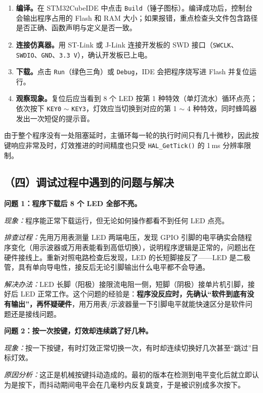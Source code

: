 \documentclass[UTF8,zihao=5,fontset=fandol]{ctexart}
\begin{document}
\begin{reportsection}{\ProcessTitle}{\ProcessHint}
  \begin{enumerate}[label=\arabic*)]
    \item \textbf{编译。}在 STM32CubeIDE 中点击 \texttt{Build}（锤子图标）。编译成功后，控制台会输出程序占用的 Flash 和 RAM 大小；如果报错，重点检查头文件包含路径是否正确、函数声明与定义是否一致。
    \item \textbf{连接仿真器。}用 ST-Link 或 J-Link 连接开发板的 SWD 接口（\texttt{SWCLK}、\texttt{SWDIO}、\texttt{GND}、\texttt{3.3\,V}），确认开发板已上电。
    \item \textbf{下载。}点击 \texttt{Run}（绿色三角）或 \texttt{Debug}，IDE 会把程序烧写进 Flash 并复位运行。
    \item \textbf{观察现象。}复位后应当看到 8 个 LED 按第 1 种特效（单灯流水）循环点亮；依次按下 \texttt{KEY0} $\sim$ \texttt{KEY3}，灯效应当切换到对应的第 1 $\sim$ 4 种特效，同时蜂鸣器发出一次短促的提示音。
  \end{enumerate}

  由于整个程序没有一处阻塞延时，主循环每一轮的执行时间只有几十微秒，因此按键响应非常及时，灯效推进的时间精度也只受 \texttt{HAL\_GetTick()} 的 1\,ms 分辨率限制。

  \subsection*{（四）调试过程中遇到的问题与解决}

  \textbf{问题 1：程序下载后 8 个 LED 全部不亮。}

  \emph{现象：}程序能正常下载运行，但无论如何操作都看不到任何 LED 点亮。

  \emph{排查过程：}先用万用表测量 LED 两端电压，发现 GPIO 引脚的电平确实会随程序变化（用示波器或万用表能看到高低切换），说明程序逻辑是正常的，问题出在硬件接线上。重新对照电路检查后发现，LED 的长短脚接反了——LED 是二极管，具有单向导电性，接反后无论引脚输出什么电平都不会导通。

  \emph{解决办法：}LED 长脚（阳极）接限流电阻一侧，短脚（阴极）接单片机引脚，接好后 LED 正常工作。这个问题的经验是：\textbf{程序没反应时，先确认“软件到底有没有输出”，再怀疑硬件}，用万用表/示波器量一下引脚电平就能快速区分是软件问题还是接线问题。

  \textbf{问题 2：按一次按键，灯效却连续跳了好几种。}

  \emph{现象：}按一下按键，有时灯效正常切换一次，有时却连续切换好几次甚至“跳过”目标灯效。

  \emph{原因分析：}这正是机械按键抖动造成的。最初的版本在检测到电平变化后就立即认为是按下，而抖动期间电平会在几毫秒内反复跳变，于是被识别成多次按下。


\end{reportsection}
\end{document}

